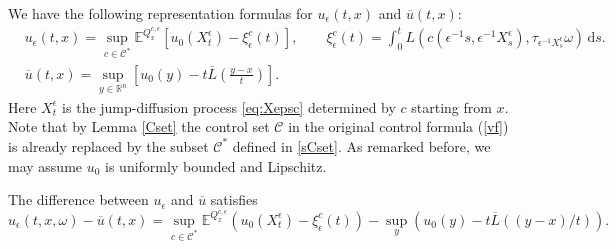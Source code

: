 \documentclass[11pt,reqno]{amsart}
\theoremstyle{definition}
\theoremstyle{remark}
\numberwithin{equation}{section}
\newcommand{\eps}{\epsilon}
\newcommand{\R}{{\mathbb{R}}}
\newcommand{\ol}{\overline}
\begin{document}
We have the following representation formulas for $u_\eps(t,x)$ and $\overline{u}(t,x)$:
\begin{equation*}
    \begin{aligned}
        &u_\epsilon(t,x) = \sup_{c\in \mathscr{C}^*} \mathbb{E}^{Q^{c,\epsilon}_x} \left[u_0(X^\epsilon_t) - \xi^c_\epsilon(t)\right], \qquad \xi^c_\epsilon(t) = \int_0^t L(c(\epsilon^{-1}s, \epsilon^{-1}X^\epsilon_s), \tau_{\epsilon^{-1}X^\epsilon_s} \omega)\,\mathrm{d}s.\\
        & \overline{u}(t,x) = \sup_{y\in \R^n} \left[u_0(y) - t\overline{L}\left(\frac{y-x}{t}\right)\right].
    \end{aligned}
\end{equation*}
Here $X^\epsilon_t$ is the jump-diffusion process \eqref{eq:Xepsc} determined by $c$ starting from $x$. Note that by Lemma \ref{Cset} the control set $\mathscr{C}$ in the original control formula (\ref{vf}) is already replaced by the subset $\mathscr{C}^{\ast}$ defined in \eqref{sCset}. As remarked before, we may assume $u_0$ is uniformly bounded and Lipschitz. 

The difference between $u_\eps$ and $\ol u$ satisfies
\begin{equation}
\label{eq:diffform}
      u_{\epsilon}(t,x,\omega) - \ol u(t,x)
    =  \sup_{c\in\mathscr{C}^{\ast}} \mathbb{E}^{Q^{c,\epsilon}_{x} }\left( u_{0}(X^{\epsilon}_{t}) - \xi^c_{\epsilon}(t) \right) - \sup_{y}(u_{0}(y)- t \overline{L}((y-x)/t)). 
\end{equation}

\medskip 
\end{document}
